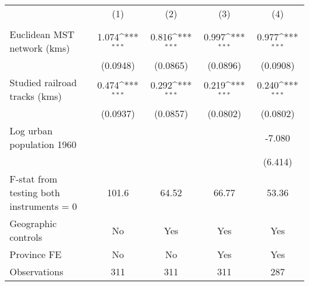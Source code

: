 {
\def\sym#1{\ifmmode^{#1}\else\(^{#1}\)\fi}
\begin{tabular}{l*{4}{c}}
\hline\hline
                &\multicolumn{1}{c}{(1)}&\multicolumn{1}{c}{(2)}&\multicolumn{1}{c}{(3)}&\multicolumn{1}{c}{(4)}\\
                &\multicolumn{1}{c}{}&\multicolumn{1}{c}{}&\multicolumn{1}{c}{}&\multicolumn{1}{c}{}\\
\hline
Euclidean MST network (kms)&    1.074\sym{***}&    0.816\sym{***}&    0.997\sym{***}&    0.977\sym{***}\\
                & (0.0948)         & (0.0865)         & (0.0896)         & (0.0908)         \\
[1em]
Studied railroad tracks (kms)&    0.474\sym{***}&    0.292\sym{***}&    0.219\sym{***}&    0.240\sym{***}\\
                & (0.0937)         & (0.0857)         & (0.0802)         & (0.0802)         \\
[1em]
Log urban population 1960&                  &                  &                  &   -7.080         \\
                &                  &                  &                  &  (6.414)         \\
\hline
F-stat from testing both instruments = 0&    101.6         &    64.52         &    66.77         &    53.36         \\
Geographic controls&       No         &      Yes         &      Yes         &      Yes         \\
Province FE     &       No         &       No         &      Yes         &      Yes         \\
Observations    &      311         &      311         &      311         &      287         \\
\hline\hline
\end{tabular}
}
